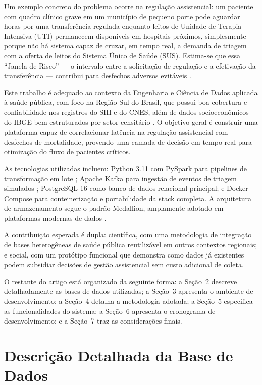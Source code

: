 \documentclass[12pt]{article}
\begin{document}
Um exemplo concreto do problema ocorre na regulação assistencial: um paciente
com quadro clínico grave em um município de pequeno porte pode aguardar horas
por uma transferência regulada enquanto leitos de Unidade de Terapia Intensiva
(UTI) permanecem disponíveis em hospitais próximos, simplesmente porque não há
sistema capaz de cruzar, em tempo real, a demanda de triagem com a oferta de
leitos do Sistema Único de Saúde (SUS). Estima-se que essa ``Janela de Risco''
— o intervalo entre a solicitação de regulação e a efetivação da transferência
— contribui para desfechos adversos evitáveis \cite{mendes2011}.

Este trabalho é adequado ao contexto da Engenharia e Ciência de Dados
aplicada à saúde pública, com foco na Região Sul do Brasil, que possui boa
cobertura e confiabilidade nos registros do SIH e do CNES, além de dados
socioeconômicos do IBGE bem estruturados por setor censitário \cite{ibge2023}.
O objetivo geral é construir uma plataforma capaz de correlacionar latência
na regulação assistencial com desfechos de mortalidade, provendo uma camada
de decisão em tempo real para otimização do fluxo de pacientes críticos.

As tecnologias utilizadas incluem: Python 3.11 com PySpark para pipelines de
transformação em lote \cite{spark2016}; Apache Kafka para ingestão de eventos
de triagem simulados \cite{kafka2021}; PostgreSQL 16 como banco de dados
relacional principal; e Docker Compose para conteinerização e portabilidade
da stack completa. A arquitetura de armazenamento segue o padrão Medallion,
amplamente adotado em plataformas modernas de dados \cite{databricks2021}.

A contribuição esperada é dupla: científica, com uma metodologia de integração
de bases heterogêneas de saúde pública reutilizável em outros contextos
regionais; e social, com um protótipo funcional que demonstra como dados já
existentes podem subsidiar decisões de gestão assistencial sem custo adicional
de coleta.

O restante do artigo está organizado da seguinte forma: a Seção~2 descreve
detalhadamente as bases de dados utilizadas; a Seção~3 apresenta o ambiente
de desenvolvimento; a Seção~4 detalha a metodologia adotada; a Seção~5
especifica as funcionalidades do sistema; a Seção~6 apresenta o cronograma de
desenvolvimento; e a Seção~7 traz as considerações finais.


\section{Descrição Detalhada da Base de Dados}
\end{document}
